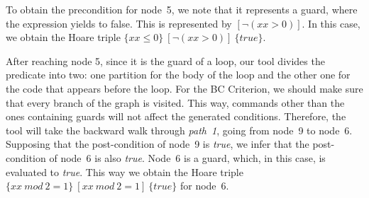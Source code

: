 \documentclass[runningheads]{llncs}
\begin{document}
To obtain the precondition for node~5, we note that it represents a guard, where the expression yields to false.
This is represented by $[\neg(xx > 0)]$.
In this case, we obtain the Hoare triple $\{xx \leq 0\}\ [\neg(xx > 0)]\ \{true\}$.


After reaching node 5, since it is the guard of a loop, our tool divides the predicate into two: one partition for the body of the loop and the other one for the code that appears before the loop. 
For the BC Criterion, we should make sure that every branch of the graph is visited.
This way, commands other than the ones containing guards will not affect the generated conditions.
Therefore, the tool will take the backward walk through \textit{path~1}, going from node~9 to node~6.
Supposing that the post-condition of node~9 is \textit{true}, we infer that the post-condition of node~6 is also \textit{true}.
Node~6 is a guard, which, in this case, is evaluated to \textit{true}.
This way we obtain the Hoare triple $\{xx\ mod\ 2=1\}\ [xx\ mod\ 2=1]\ \{true\}$ for node~6.




\end{document}

